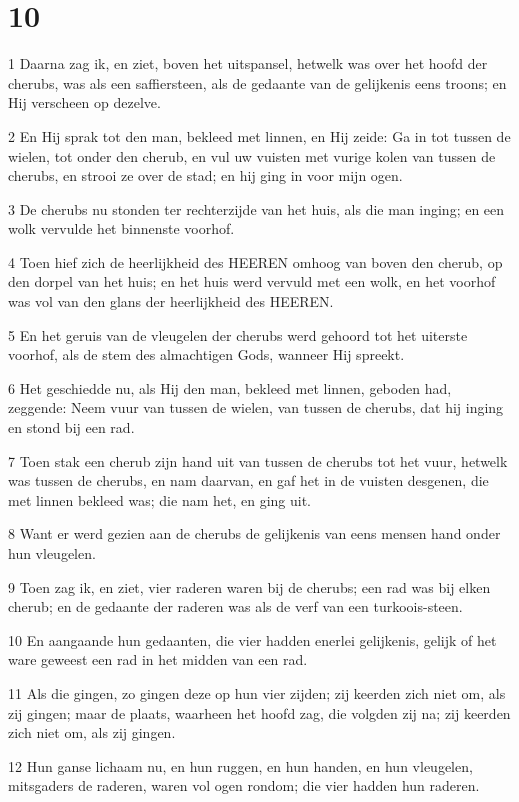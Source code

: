 \chapter{10}

\par 1 Daarna zag ik, en ziet, boven het uitspansel, hetwelk was over het hoofd der cherubs, was als een saffiersteen, als de gedaante van de gelijkenis eens troons; en Hij verscheen op dezelve.
\par 2 En Hij sprak tot den man, bekleed met linnen, en Hij zeide: Ga in tot tussen de wielen, tot onder den cherub, en vul uw vuisten met vurige kolen van tussen de cherubs, en strooi ze over de stad; en hij ging in voor mijn ogen.
\par 3 De cherubs nu stonden ter rechterzijde van het huis, als die man inging; en een wolk vervulde het binnenste voorhof.
\par 4 Toen hief zich de heerlijkheid des HEEREN omhoog van boven den cherub, op den dorpel van het huis; en het huis werd vervuld met een wolk, en het voorhof was vol van den glans der heerlijkheid des HEEREN.
\par 5 En het geruis van de vleugelen der cherubs werd gehoord tot het uiterste voorhof, als de stem des almachtigen Gods, wanneer Hij spreekt.
\par 6 Het geschiedde nu, als Hij den man, bekleed met linnen, geboden had, zeggende: Neem vuur van tussen de wielen, van tussen de cherubs, dat hij inging en stond bij een rad.
\par 7 Toen stak een cherub zijn hand uit van tussen de cherubs tot het vuur, hetwelk was tussen de cherubs, en nam daarvan, en gaf het in de vuisten desgenen, die met linnen bekleed was; die nam het, en ging uit.
\par 8 Want er werd gezien aan de cherubs de gelijkenis van eens mensen hand onder hun vleugelen.
\par 9 Toen zag ik, en ziet, vier raderen waren bij de cherubs; een rad was bij elken cherub; en de gedaante der raderen was als de verf van een turkoois-steen.
\par 10 En aangaande hun gedaanten, die vier hadden enerlei gelijkenis, gelijk of het ware geweest een rad in het midden van een rad.
\par 11 Als die gingen, zo gingen deze op hun vier zijden; zij keerden zich niet om, als zij gingen; maar de plaats, waarheen het hoofd zag, die volgden zij na; zij keerden zich niet om, als zij gingen.
\par 12 Hun ganse lichaam nu, en hun ruggen, en hun handen, en hun vleugelen, mitsgaders de raderen, waren vol ogen rondom; die vier hadden hun raderen.
